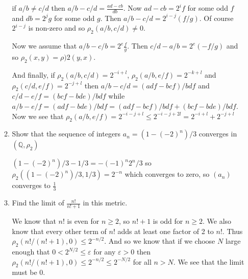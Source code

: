 \documentclass[letterpaper]{article}
\begin{document}
\begin{enumerate}
\begin{enumerate}
    if $a/b\ne c/d$ then $a/b-c/d=\frac{ad-cb}{db}$. Now $ad-cb=2^{i}f$ for some odd $f$ and $db=2^{j}g$ for some odd $g$. Then $a/b-c/d=2^{i-j}(f/g)$. Of course $2^{i-j}$ is non-zero and so $\rho_2(a/b,c/d)\ne 0$.

    Now we assume that $a/b-c/b=2^e\frac{f}{g}$. Then $c/d-a/b=2^e(-f/g)$ and so $\rho_2(x,y)=\rho)2(y,x)$.

    And finally, if $\rho_2(a/b,c/d)=2^{-i+l}$, $\rho_2(a/b,e/f)=2^{-k+l}$ and $\rho_2(c/d,e/f)=2^{-j+l}$ then $a/b-c/d=(adf-bcf)/bdf$ and $c/d-e/f=(bcf-bde)/bdf$ while $a/b-e/f=(adf-bde)/bdf=(adf-bcf)/bdf+(bcf-bde)/bdf$. Now we see that $\rho_2(a/b,e/f)=2^{-i-j+l}\le 2^{-i-j+2l}=2^{-i+l}+2^{-j+l}$
    \item
    Show that the sequence of integers $a_n=(1-(-2)^n)/3$ converges in
    $(\mathbb{Q},\rho_2)$

    $(1-(-2)^n)/3-1/3=-(-1)^n2^n/3$ so $\rho_2((1-(-2)^n)/3,1/3)=2^{-n}$ which converges to zero, so $(a_n)$ converges to $\frac{1}{3}$
    \item
    Find the limit of $\displaystyle \frac{n!}{n!+1}$ in this metric.

    We know that $n!$ is even for $n\ge 2$, so $n!+1$ is odd for $n\ge 2$. We also know that every other term of $n!$ adds at least one factor of 2 to $n!$. Thus $\rho_2(n!/(n!+1),0)\le2^{-n/2}$. And so we know that if we choose $N$ large enough that $0<2^{N/2}\le \varepsilon$ for any $\varepsilon>0$ then $\rho_2(n!/(n!+1),0)\le2^{-n/2}\le 2^{-N/2}$ for all $n>N$. We see that the limit must be 0.
  \end{enumerate}
\end{enumerate}
\end{document}
